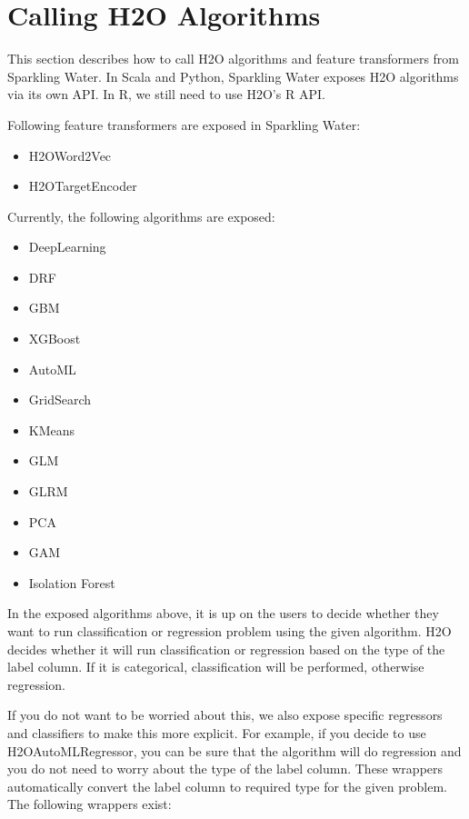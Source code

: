 \documentclass{standalone}
\begin{document}
	\section{Calling H2O Algorithms}

	This section describes how to call H2O algorithms and feature transformers from Sparkling Water. In Scala and Python, Sparkling Water
	exposes H2O algorithms via its own API. In R, we still need to use H2O's R API.

	Following feature transformers are exposed in Sparkling Water:

	\begin{itemize}
		\item H2OWord2Vec
		\item H2OTargetEncoder
	\end{itemize}

	Currently, the following algorithms are exposed:

	\begin{itemize}
		\item DeepLearning
		\item DRF
		\item GBM
		\item XGBoost
		\item AutoML
		\item GridSearch
		\item KMeans
		\item GLM
		\item GLRM
		\item PCA
		\item GAM
		\item Isolation Forest
	\end{itemize}

	In the exposed algorithms above, it is up on the users to decide whether they want to run classification or
	regression problem using the given algorithm. H2O decides whether it will run classification or regression based
	on the type of the label column. If it is categorical, classification will be performed, otherwise regression.

	If you do not want to be worried about this, we also expose specific regressors and classifiers to make this more
	explicit. For example, if you decide to use H2OAutoMLRegressor, you can be sure that the algorithm will do regression
	and you do not need to worry about the type of the label column. These wrappers automatically convert the label
	column to required type for the given problem. The following wrappers exist:
\end{document}
